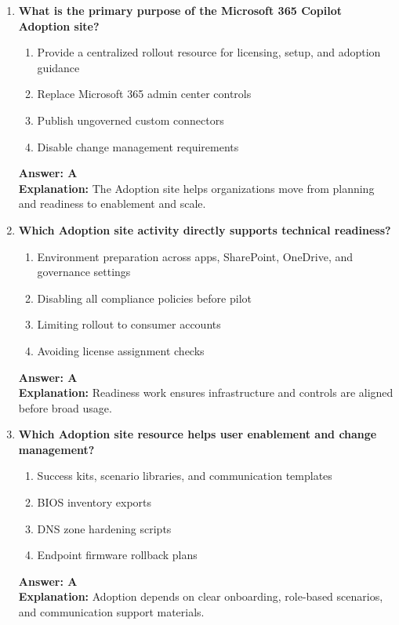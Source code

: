 \documentclass[10pt]{article}
\begin{document}
\begin{enumerate}[leftmargin=*]
\item \textbf{What is the primary purpose of the Microsoft 365 Copilot Adoption site?}
\begin{enumerate}[label=\Alph*.]
  \item Provide a centralized rollout resource for licensing, setup, and adoption guidance
  \item Replace Microsoft 365 admin center controls
  \item Publish ungoverned custom connectors
  \item Disable change management requirements
\end{enumerate}
\textbf{Answer: A}\\
\textbf{Explanation:} The Adoption site helps organizations move from planning and readiness to enablement and scale.

\item \textbf{Which Adoption site activity directly supports technical readiness?}
\begin{enumerate}[label=\Alph*.]
  \item Environment preparation across apps, SharePoint, OneDrive, and governance settings
  \item Disabling all compliance policies before pilot
  \item Limiting rollout to consumer accounts
  \item Avoiding license assignment checks
\end{enumerate}
\textbf{Answer: A}\\
\textbf{Explanation:} Readiness work ensures infrastructure and controls are aligned before broad usage.

\item \textbf{Which Adoption site resource helps user enablement and change management?}
\begin{enumerate}[label=\Alph*.]
  \item Success kits, scenario libraries, and communication templates
  \item BIOS inventory exports
  \item DNS zone hardening scripts
  \item Endpoint firmware rollback plans
\end{enumerate}
\textbf{Answer: A}\\
\textbf{Explanation:} Adoption depends on clear onboarding, role-based scenarios, and communication support materials.


\end{enumerate}
\end{document}

